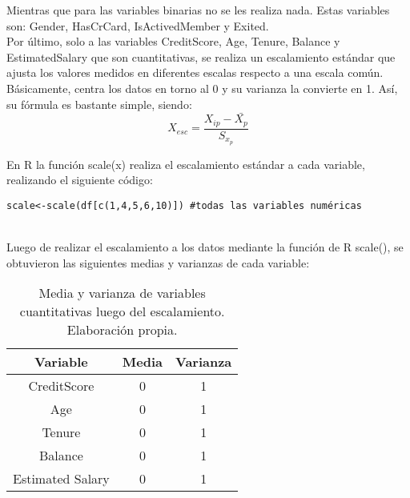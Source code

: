 \documentclass{report}
\begin{document}
Mientras que para las variables binarias no se les realiza nada. Estas variables son: Gender, HasCrCard, IsActivedMember y Exited.\\
        
Por último, solo a las variables CreditScore, Age, Tenure, Balance y EstimatedSalary que son cuantitativas, se realiza un escalamiento estándar que ajusta los valores medidos en diferentes escalas respecto a una escala común. Básicamente, centra los datos en torno al 0 y su varianza la convierte en 1. Así, su fórmula es bastante simple, siendo:\\
\begin{equation}
    X_{esc}= \frac{X_{ip}-\bar{X_{p}}}{S_{x_{p}}}
\end{equation}

En R la función scale(x) realiza el escalamiento estándar a cada variable, realizando el siguiente código:\\

\begin{lstlisting}[Language=R, caption={Escalamiento estándar de variables cuantitativas},captionpos=b]
scale<-scale(df[c(1,4,5,6,10)]) #todas las variables numéricas
\end{lstlisting}\\

Luego de realizar el escalamiento a los datos mediante la función de R scale(), se obtuvieron las siguientes medias y varianzas de cada variable:\\
\vspace{7cm}

\begin{table}[h!]
\begin{center}   
    \label{tab:table1}
    \begin{tabular}{|c|c|c|}
\hline
\textbf{Variable} & \textbf{Media} &\textbf{Varianza}\\
\hline
CreditScore &   0 &1  \\
\hline
Age &   0 &1  \\
\hline
Tenure &   0 &1  \\
\hline
Balance &   0 &1  \\
\hline
Estimated Salary &   0 &1  \\
\hline
   \end{tabular}
  \end{center}
  \caption{Media y varianza de variables cuantitativas luego del escalamiento. Elaboración propia.}
\end{table}\\
\end{document}
